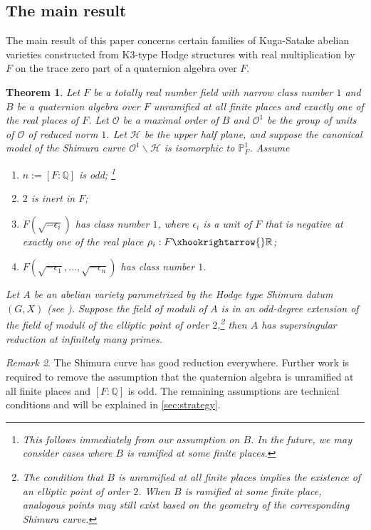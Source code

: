 \documentclass{amsart}
\numberwithin{equation}{subsection}
\newtheorem{theorem}{Theorem}
\numberwithin{theorem}{section}
\theoremstyle{definition}
\theoremstyle{remark}
\newtheorem{rem}[theorem]{Remark}
\newcommand{\bP}{\mathbb{P}}
\newcommand{\bQ}{\mathbb{Q}}
\newcommand{\bR}{\mathbb{R}}
\newcommand{\cH}{\mathcal{H}}
\newcommand{\cO}{\mathcal{O}}
\begin{document}
\subsection{The main result}

The main result of this paper concerns certain families of Kuga-Satake abelian varieties constructed from K3-type Hodge structures with real multiplication by $F$ on the trace zero part of a quaternion algebra over $F$. 
\begin{theorem}\label{thm:main}
    Let $F$ be a totally real number field with narrow class number $1$ and $B$ be a quaternion algebra over $F$ unramified at all finite places and exactly one of the real places of $F$. Let $\cO$ be a maximal order of $B$ and $\cO^1$ be the group of units of $\cO$ of reduced norm $1$. Let $\cH$ be the upper half plane, and suppose the canonical model of the Shimura curve $\cO^1\backslash \cH$ is isomorphic to $\bP^1_F$. Assume \begin{enumerate}
        \item $n := [F:\bQ]$ is odd; \footnote{This follows immediately from our assumption on $B$. In the future, we may consider cases where $B$ is ramified at some finite places.}
        \item $2$ is inert in $F$;
        \item $F(\sqrt{-\epsilon_i})$ has class number $1$, where $\epsilon_i$ is a unit of $F$ that is negative at exactly one of the real place $\rho_i:F\xhookrightarrow{}\bR$;
        \item $F(\sqrt{-\epsilon_1}, \dotsc, \sqrt{-\epsilon_n})$ has class number $1$.
    \end{enumerate}
    Let $A$ be an abelian variety parametrized by the Hodge type Shimura datum $(G,X)$ (see ). Suppose the field of moduli of $A$ is in an odd-degree extension of the field of moduli of the elliptic point of order $2$,\footnote{The condition that $B$ is unramified at all finite places implies the existence of an elliptic point of order $2$. When $B$ is ramified at some finite place, analogous points may still exist based on the geometry of the corresponding Shimura curve.} then $A$ has supersingular reduction at infinitely many primes. 
\end{theorem}
\begin{rem}
    The Shimura curve has good reduction everywhere. Further work is required to remove the assumption that the quaternion algebra is unramified at all finite places and $[F:\bQ]$ is odd. The remaining assumptions are technical conditions and will be explained in \cref{sec:strategy}. 
\end{rem}
\end{document}
